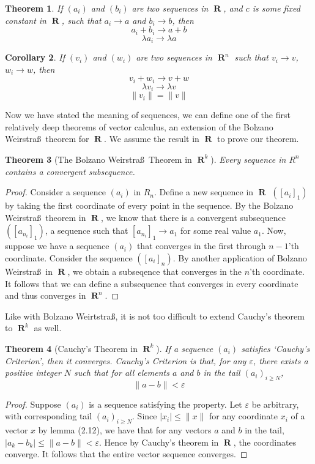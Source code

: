 \documentclass{report}
\newtheorem{theorem}{Theorem}[chapter]
\newtheorem{corollary}[theorem]{Corollary}
\DeclareMathOperator{\real}{\mathbf{R}}
\begin{document}
\begin{theorem}
  If $(a_i)$ and $(b_i)$ are two sequences in $\real$, and $c$ is some fixed constant in $\real$, such that $a_i \to a$ and $ b_i \to b$, then
  \[ a_i + b_i \to a + b \]
  \[ \lambda a_i \to \lambda a \]
\end{theorem}

\begin{corollary}
  If $(v_i)$ and $(w_i)$ are two sequences in $\real^n$ such that $v_i \to v$, $w_i \to w$, then
  \[v_i + w_i \to v + w\]
  \[ \lambda v_i \to \lambda v \]
  \[ \| v_i \| = \| v \| \]
\end{corollary}

Now we have stated the meaning of sequences, we can define one of the first relatively deep theorems of vector calculus, an extension of the Bolzano Weirstra\ss\ theorem for $\real$. We assume the result in $\real$ to prove our theorem.

\begin{theorem}[The Bolzano Weirstra\ss\ Theorem in $\real^k$]
  Every sequence in $R^n$ contains a convergent subsequence.
\end{theorem}
\begin{proof}
  Consider a sequence $(a_i)$ in $R_n$. Define a new sequence in $\real$ $([a_i]_1)$ by taking the first coordinate of every point in the sequence. By the Bolzano Weirstra\ss\ theorem in $\real$, we know that there is a convergent subsequence $([a_{n_i}]_1)$, a sequence such that $[a_{n_i}]_1 \to a_1$ for some real value $a_1$. Now, suppose we have a sequence $(a_i)$ that converges in the first through $n-1$'th coordinate. Consider the sequence $([a_i]_n)$. By another application of Bolzano Weirstra\ss\ in $\real$, we obtain a subseqence that converges in the $n$'th coordinate. It follows that we can define a subsequence that converges in every coordinate and thus converges in $\real^n$.
\end{proof}

Like with Bolzano Weirtstra\ss, it is not too difficult to extend Cauchy's theorem to $\real^k$ as well.

\begin{theorem}[Cauchy's Theorem in $\real^k$]
  If a sequence $(a_i)$ satisfies `Cauchy's Criterion', then it converges. Cauchy's Criterion is that, for any $\varepsilon$, there exists a positive integer $N$ such that for all elements $a$ and $b$ in the tail $(a_i)_{i \geq N}$,
  \[ \| a - b \| < \varepsilon \]
\end{theorem}
\begin{proof}
  Suppose $(a_i)$ is a sequence satisfying the property. Let $\varepsilon$ be arbitrary, with corresponding tail $(a_i)_{i \geq N}$. Since $|x_i| \leq \|x\|$ for any coordinate $x_i$ of a vector $x$ by lemma (2.12), we have that for any vectors $a$ and $b$ in the tail, $|a_k - b_k| \leq \|a - b\| < \varepsilon$. Hence by Cauchy's theorem in $\real$, the coordinates converge. It follows that the entire vector sequence converges.
\end{proof}
\end{document}

